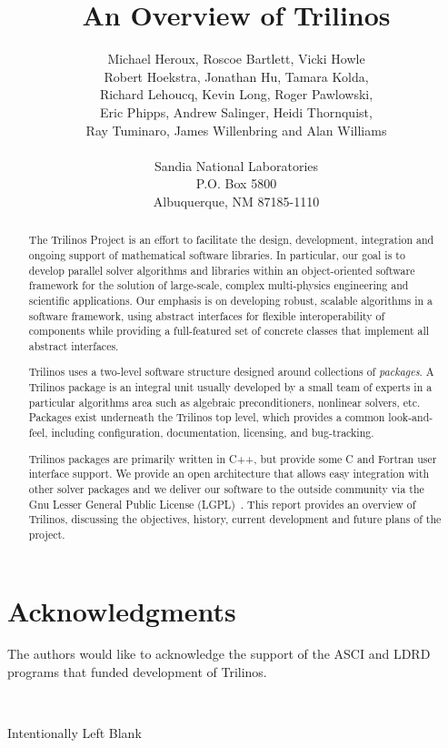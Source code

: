 \documentclass[12pt,relax]{TrilinosOverview}
\title{An Overview of Trilinos}
\author{Michael Heroux, Roscoe Bartlett, Vicki Howle \\
Robert Hoekstra, Jonathan Hu, Tamara Kolda, \\
Richard Lehoucq, Kevin Long, Roger Pawlowski, \\
Eric Phipps, Andrew Salinger, Heidi Thornquist, \\
Ray Tuminaro, James Willenbring and Alan Williams \\
 \\
Sandia National Laboratories \\
P.O. Box 5800 \\
Albuquerque, NM 87185-1110
}
\date{}
\begin{document}
\maketitle

\begin{abstract}
The Trilinos Project is an effort to facilitate the design,
development, integration and ongoing support of mathematical software
libraries.  In particular, our goal is to develop parallel solver 
algorithms and libraries within 
an object-oriented software framework for the solution of large-scale, complex
multi-physics engineering and scientific applications.   Our emphasis is on 
developing robust, scalable algorithms in a software framework, using abstract 
interfaces for flexible interoperability of components while providing a 
full-featured set of concrete classes that implement all abstract
interfaces.  

Trilinos uses a two-level software structure designed around
collections of
{\it packages}.  A Trilinos package is an integral unit usually
developed by a small team of experts in a particular algorithms area
such as algebraic preconditioners, nonlinear solvers, etc.  
Packages exist underneath
the Trilinos top level, which provides a common look-and-feel,
including configuration, documentation, licensing, and bug-tracking.

Trilinos packages are primarily written in C++, but provide some C and 
Fortran user interface support.  We provide an open architecture that allows 
easy integration with other solver packages and we deliver our software to 
the outside community via the Gnu Lesser General Public License
(LGPL)~\cite{gnu-license-site}.
This report provides an overview of Trilinos, discussing the 
objectives, history, current development and future plans of the project.
\end{abstract}


\clearpage
\section*{Acknowledgments}
The authors would like to acknowledge the support of the ASCI and LDRD programs
that funded development of Trilinos.

\newpage
\
\vspace{3.5in}
\begin{center}Intentionally Left Blank\end{center}
\clearpage
\tableofcontents
\listoffigures

\clearpage
{}
\end{document}
